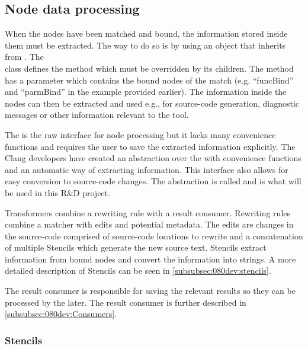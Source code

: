 \subsection{Node data processing} \label{subsec:080dev:NodeDataProcessing}

When the nodes have been matched and bound, the information stored inside them must be extracted. The way to do so is by using an object that inherits from .
The \\ class defines the  method which must be overridden by its children. The  method has a  parameter which contains the bound nodes of the match (e.g. ``funcBind'' and ``parmBind'' in the example provided earlier).
The information inside the nodes can then be extracted and used e.g., for source-code generation, diagnostic messages or other information relevant to the tool.

The  is the raw interface for node processing but it lacks many convenience functions and requires the user to save the extracted information explicitly. The Clang developers have created an abstraction over the  with convenience functions and an automatic way of extracting information. This interface also allows for easy conversion to source-code changes. The abstraction is called  and is what will be used in this R\&D project.

Transformers combine a rewriting rule with a result consumer. Rewriting rules combine a matcher with edits and potential metadata. The edits are changes in the source-code comprised of source-code locations to rewrite and a concatenation of multiple Stencils which generate the new source text. Stencils extract information from bound nodes and convert the information into strings. A more detailed description of Stencils can be seen in \cref{subsubsec:080dev:stencils}.

The result consumer is responsible for saving the relevant results so they can be processed by the  later. The result consumer is further described in \cref{subsubsec:080dev:Consumers}.

\subsubsection*{Stencils} \label{subsubsec:080dev:stencils}

